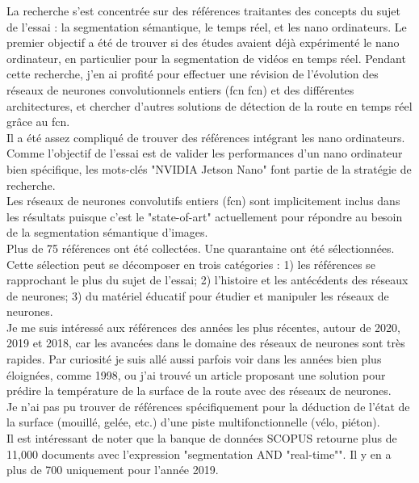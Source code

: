 ﻿\noindent La recherche s'est concentrée sur des références traitantes des concepts du sujet de l'essai : la segmentation sémantique, le temps réel, et les nano ordinateurs. Le premier objectif a été de trouver si des études avaient déjà expérimenté le nano ordinateur, en particulier pour la segmentation de vidéos en temps réel. Pendant cette recherche, j'en ai profité pour effectuer une révision de l'évolution des réseaux de neurones convolutionnels entiers (\acrshort{fcn} \acrlong{fcn})  et des différentes architectures, et chercher d'autres solutions de détection de la route en temps réel grâce au \acrshort{fcn}. 
\vspace{\baselineskip}
\\
\noindent Il a été assez compliqué de trouver des références intégrant les nano ordinateurs. Comme l'objectif de l'essai est de valider les performances d'un nano ordinateur bien spécifique, les mots-clés "NVIDIA Jetson Nano" font partie de la stratégie de recherche. 
\vspace{\baselineskip}
\\
\noindent Les réseaux de neurones convolutifs entiers (\acrshort{fcn}) sont implicitement inclus dans les résultats puisque c'est le "state-of-art" actuellement pour répondre au besoin de la segmentation sémantique d'images.
\vspace{\baselineskip}
\\
\noindent Plus de 75 références ont été collectées. Une quarantaine ont été sélectionnées. Cette sélection peut se décomposer en trois catégories : 1) les références se rapprochant le plus du sujet de l'essai; 2) l'histoire et les antécédents des réseaux de neurones; 3) du matériel éducatif pour étudier et manipuler les réseaux de neurones.
\vspace{\baselineskip}
\\
\noindent Je me suis intéressé aux références des années les plus récentes, autour de 2020, 2019 et 2018, car les avancées dans le domaine des réseaux de neurones sont très rapides. Par curiosité je suis allé aussi parfois voir dans les années bien plus éloignées, comme 1998, ou j'ai trouvé un article proposant une solution pour prédire la température de la surface de la route avec des réseaux de neurones.
\vspace{\baselineskip}
\\
\noindent Je n'ai pas pu trouver de références spécifiquement pour la déduction de l'état de la surface (mouillé, gelée, etc.) d'une piste multifonctionnelle (vélo, piéton). 
\vspace{\baselineskip}
\\
\noindent Il est intéressant de noter que la banque de données SCOPUS retourne plus de 11,000 documents avec l'expression "segmentation AND "real-time"". Il y en a plus de 700 uniquement pour l'année 2019. 